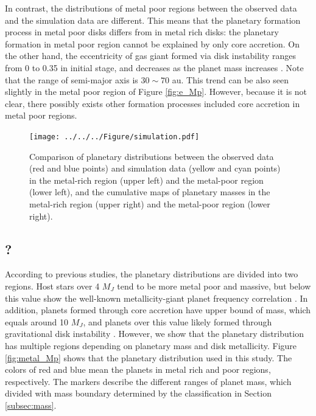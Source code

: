 \documentclass[twocolumn, dvipdfmx]{aastex62}
\begin{document}
\begin{CJK*}{UTF8}{min}
In contrast, the distributions of metal poor regions between the observed data and the simulation data are different. This means that the planetary formation process in metal poor disks differs from in metal rich disks: the planetary formation in metal poor region cannot be explained by only core accretion. On the other hand, the eccentricity of gas giant formed via disk instability ranges from 0 to 0.35 in initial stage, and decreases as the planet mass increases \citep{2011ApJ...731...74B}. Note that the range of semi-major axis is $30\sim70$ au. This trend can be also seen slightly in the metal poor region of Figure \ref{fig:e_Mp}. However, because it is not clear, there possibly exists other formation processes included core accretion in metal poor regions.

\begin{figure}[t]
\begin{center}
\texttt{[image: ../../../Figure/simulation.pdf]}
\caption{Comparison of planetary distributions between the observed data (red and blue points) and simulation data (yellow and cyan points) in the metal-rich region (upper left) and the metal-poor region (lower left), and the cumulative maps of planetary masses in the metal-rich region (upper right) and the metal-poor region (lower right). \label{fig:simulation}}
\end{center}
\end{figure}


\subsection{?}

According to previous studies, the planetary distributions are divided into two regions. Host stars over 4 $M_J$ tend to be more metal poor and massive, but below this value show the well-known metallicity-giant planet frequency correlation \citep{2017A&A...603A..30S}. In addition, planets formed through core accretion have upper bound of mass, which equals around 10 $M_J$, and planets over this value likely formed through gravitational disk instability \citep{2018ApJ...853...37S}.  However, we show that the planetary distribution has multiple regions depending on planetary mass and disk metallicity. Figure \ref{fig:metal_Mp} shows that the planetary distribution used in this study. The colors of red and blue mean the planets in metal rich and poor regions, respectively. The markers describe the different ranges of planet mass, which divided with mass boundary determined by the classification in Section \ref{subsec:mass}. 


\end{CJK*}
\end{document}
